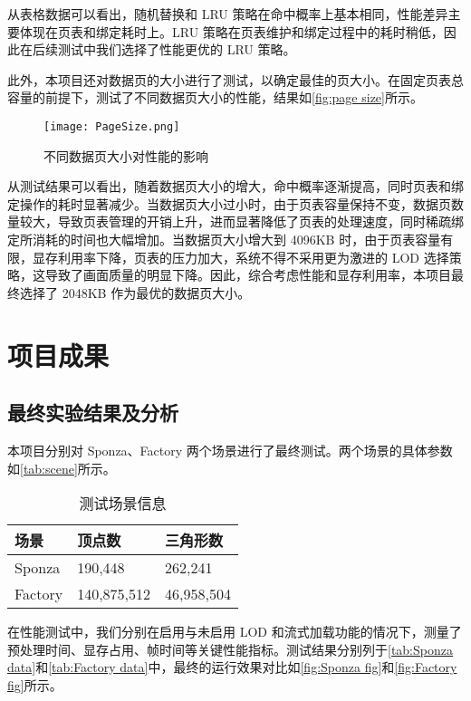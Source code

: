 从表格数据可以看出，随机替换和 LRU 策略在命中概率上基本相同，性能差异主要体现在页表和绑定耗时上。LRU 策略在页表维护和绑定过程中的耗时稍低，因此在后续测试中我们选择了性能更优的 LRU 策略。

此外，本项目还对数据页的大小进行了测试，以确定最佳的页大小。在固定页表总容量的前提下，测试了不同数据页大小的性能，结果如\autoref{fig:page size}所示。

\begin{figure}[ht]
    \centering
    \texttt{[image: PageSize.png]}
    \caption{\label{fig:page size}不同数据页大小对性能的影响}
\end{figure}

从测试结果可以看出，随着数据页大小的增大，命中概率逐渐提高，同时页表和绑定操作的耗时显著减少。当数据页大小过小时，由于页表容量保持不变，数据页数量较大，导致页表管理的开销上升，进而显著降低了页表的处理速度，同时稀疏绑定所消耗的时间也大幅增加。当数据页大小增大到 4096KB 时，由于页表容量有限，显存利用率下降，页表的压力加大，系统不得不采用更为激进的 LOD 选择策略，这导致了画面质量的明显下降。因此，综合考虑性能和显存利用率，本项目最终选择了 2048KB 作为最优的数据页大小。

\section{项目成果}

\subsection{最终实验结果及分析}

本项目分别对 Sponza、Factory 两个场景进行了最终测试。两个场景的具体参数如\autoref{tab:scene}所示。

\begin{table}[H]
    \caption{\label{tab:scene}测试场景信息}
    \begin{tabularx}{\linewidth}{|X<{\centering}|X<{\centering}|X<{\centering}|}
        \hline
        场景 & 顶点数 & 三角形数 \\ \hline
        Sponza & 190,448 & 262,241 \\ \hline
        Factory & 140,875,512 & 46,958,504 \\ \hline
    \end{tabularx}
\end{table}

在性能测试中，我们分别在启用与未启用 LOD 和流式加载功能的情况下，测量了预处理时间、显存占用、帧时间等关键性能指标。测试结果分别列于\autoref{tab:Sponza data}和\autoref{tab:Factory data}中，最终的运行效果对比如\autoref{fig:Sponza fig}和\autoref{fig:Factory fig}所示。

